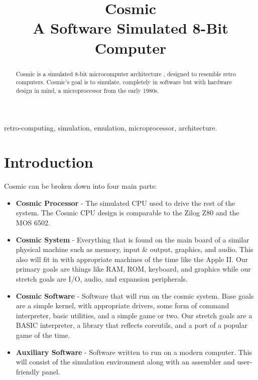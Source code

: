 \documentclass[conference]{IEEEtran}
\begin{document}
\title{
 Cosmic\\A Software Simulated 8-Bit Computer}

\author{
\and
{}

}

\maketitle

\begin{abstract}
Cosmic is a simulated 8-bit microcomputer architecture , designed to resemble retro computers. Cosmic's goal is to simulate, completely in software but with hardware design in mind, a microprocessor from the early 1980s. 
\end{abstract}

\begin{IEEEkeywords}
retro-computing, simulation, emulation, microprocessor, architecture.
\end{IEEEkeywords}

\section{Introduction}
Cosmic can be broken down into four main parts:
\begin{itemize}
    \item \textbf{Cosmic Processor} - The simulated CPU used to drive the rest of the system. The Cosmic CPU design is comparable to the Zilog Z80 and the MOS 6502. 
    \item \textbf{Cosmic System} - Everything that is found on the main board of a similar physical machine such as memory, input \& output, graphics, and audio. This also will fit in with appropriate machines of the time like the Apple II. Our primary goals are things like RAM, ROM, keyboard, and graphics while our stretch goals are I/O, audio, and expansion peripherals. 
    \item \textbf{Cosmic Software}  - Software that will run on the cosmic system. Base goals are a simple kernel, with appropriate drivers, some form of command interpreter, basic utilities, and a simple game or two. Our stretch goals are a BASIC interpreter, a library that reflects coreutils, and a port of a popular game of the time. 
    \item \textbf{Auxiliary Software} - Software written to run on a modern computer. This will consist of the simulation environment along with an assembler and user-friendly panel.
\end{itemize}
\end{document}
